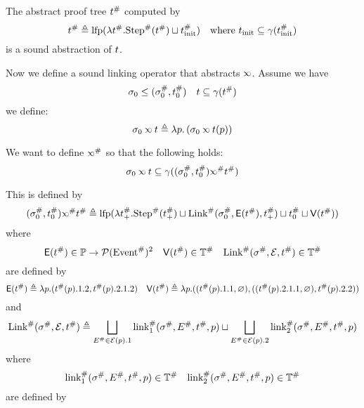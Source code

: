 \documentclass{article}
\begin{document}
The abstract proof tree ${t}^{\#}$ computed by
\[{t}^{\#}\triangleq\text{lfp}(\lambda{t}^{\#}.{\text{Step}}^{\#}({t}^{\#})\sqcup{t}^{\#}_{\text{init}})\quad\text{where }t_{\text{init}}\subseteq\gamma({t}^{\#}_{\text{init}})\]
is a sound abstraction of $t$.

Now we define a sound linking operator that abstracts $\semlink$.
Assume we have
\[\sigma_0\le({\sigma}^{\#}_0,{t}^{\#}_0)\quad t\subseteq\gamma({t}^{\#})\]
we define:
\[\ctx_0\semlink\ptree\triangleq\lambda p.\left(\ctx_0\semlink\ptree(p)\right)\]

We want to define $\Abs\semlink$ so that the following holds:
\[\ctx_0\semlink\ptree\subseteq\gamma((\Abs{\ctx}_0,\Abs{\ptree}_0)\Abs\semlink\Abs\ptree)\]

This is defined by
\[(\Abs{\ctx}_0,\Abs{\ptree}_0)\Abs\semlink\Abs\ptree\triangleq\lfp(\lambda\Abs{\ptree}_+.\Abs\Step(\Abs{\ptree}_+)\sqcup\Abs\Link(\Abs{\ctx}_0,\mathsf{\event}(\Abs\ptree),\Abs{\ptree}_+)\sqcup\Abs{\ptree}_0\sqcup\mathsf{V}(\Abs\ptree))\]
where
\[\mathsf{E}({t}^{\#})\in\mathbb{P}\rightarrow\mathcal{P}({\text{Event}}^{\#})^2\quad\mathsf{V}({t}^{\#})\in{\mathbb{T}}^{\#}\quad{\text{Link}}^{\#}({\sigma}^{\#},\mathcal{E},{t}^{\#})\in{\mathbb{T}}^{\#}\]
are defined by
\[
	\mathsf{E}({t}^{\#})\triangleq\lambda p.({t}^{\#}(p).1.2,{t}^{\#}(p).2.1.2)
	\quad
	\mathsf{V}({t}^{\#})\triangleq\lambda p.(({t}^{\#}(p).1.1,\varnothing),(({t}^{\#}(p).2.1.1,\varnothing),{t}^{\#}(p).2.2))
\]
and
\[{\text{Link}}^{\#}({\sigma}^{\#},\mathcal{E},{t}^{\#})\triangleq\bigsqcup_{{E}^{\#}\in\mathcal{E}(p).1}{\text{link}}^{\#}_1({\sigma}^{\#},{E}^{\#},{t}^{\#},p)\sqcup\bigsqcup_{{E}^{\#}\in\mathcal{E}(p).2}{\text{link}}^{\#}_2({\sigma}^{\#},{E}^{\#},{t}^{\#},p)\]
where
\[{\text{link}}^{\#}_1({\sigma}^{\#},{E}^{\#},{t}^{\#},p)\in{\mathbb{T}}^{\#}\quad{\text{link}}^{\#}_2({\sigma}^{\#},{E}^{\#},{t}^{\#},p)\in{\mathbb{T}}^{\#}\]
are defined by
\end{document}
